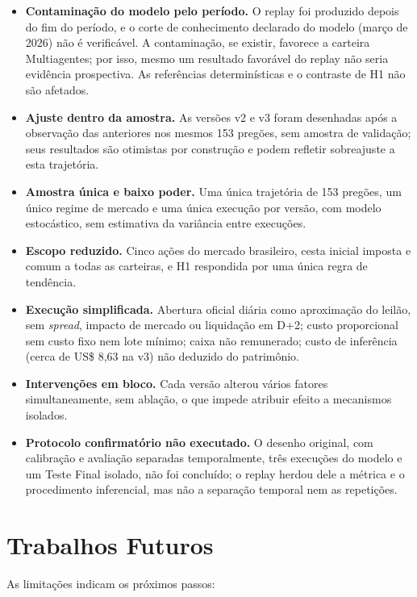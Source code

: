 \documentclass{eic-bcc-tcc}
\begin{document}
\begin{itemize}
    \item \textbf{Contaminação do modelo pelo período.} O replay foi produzido depois do fim do período, e o corte de conhecimento declarado do modelo (março de 2026) não é verificável. A contaminação, se existir, favorece a carteira Multiagentes; por isso, mesmo um resultado favorável do replay não seria evidência prospectiva. As referências determinísticas e o contraste de H1 não são afetados.
    \item \textbf{Ajuste dentro da amostra.} As versões v2 e v3 foram desenhadas após a observação das anteriores nos mesmos 153 pregões, sem amostra de validação; seus resultados são otimistas por construção e podem refletir sobreajuste a esta trajetória.
    \item \textbf{Amostra única e baixo poder.} Uma única trajetória de 153 pregões, um único regime de mercado e uma única execução por versão, com modelo estocástico, sem estimativa da variância entre execuções.
    \item \textbf{Escopo reduzido.} Cinco ações do mercado brasileiro, cesta inicial imposta e comum a todas as carteiras, e H1 respondida por uma única regra de tendência.
    \item \textbf{Execução simplificada.} Abertura oficial diária como aproximação do leilão, sem \textit{spread}, impacto de mercado ou liquidação em D+2; custo proporcional sem custo fixo nem lote mínimo; caixa não remunerado; custo de inferência (cerca de US\$ 8,63 na v3) não deduzido do patrimônio.
    \item \textbf{Intervenções em bloco.} Cada versão alterou vários fatores simultaneamente, sem ablação, o que impede atribuir efeito a mecanismos isolados.
    \item \textbf{Protocolo confirmatório não executado.} O desenho original, com calibração e avaliação separadas temporalmente, três execuções do modelo e um Teste Final isolado, não foi concluído; o replay herdou dele a métrica e o procedimento inferencial, mas não a separação temporal nem as repetições.
\end{itemize}

\section{Trabalhos Futuros}

As limitações indicam os próximos passos:
\end{document}
